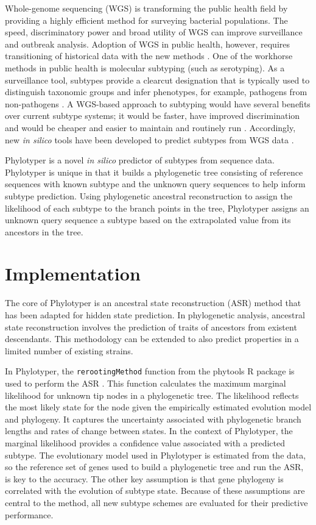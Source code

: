 \documentclass{bioinfo}
\begin{document}
Whole-genome sequencing (WGS) is transforming the public health field by providing a highly efficient method for surveying bacterial populations.
The speed, discriminatory power and broad utility of WGS can improve surveillance and outbreak analysis.
Adoption of WGS in public health, however, requires transitioning of historical data with the new methods \citep{Jenkins2015}.
One of the workhorse methods in public health is molecular subtyping (such as serotyping).
As a surveillance tool, subtypes provide a clearcut designation that is typically used to distinguish taxonomic groups and infer phenotypes, for example, pathogens from non-pathogens \citep{Jenkins2015}.
A WGS-based approach to subtyping would have several benefits over current subtype systems; it would be faster, have improved discrimination and would be cheaper and easier to maintain and routinely run \citep{Jenkins2015}.
Accordingly, new \textit{in silico} tools have been developed to predict subtypes from WGS data \citep{Inouye2014,Joensen2015,Ingle2016,Lindsey2016,CARRILLO2016}.

Phylotyper is a novel \textit{in silico} predictor of subtypes from sequence data. 
Phylotyper is unique in that it builds a phylogenetic tree consisting of reference sequences with known subtype and the unknown query sequences to help inform subtype prediction. 
Using phylogenetic ancestral reconstruction to assign the likelihood of each subtype to the branch points in the tree, Phylotyper assigns an unknown query sequence a subtype based on the extrapolated value from its ancestors in the tree.

\section{Implementation}

The core of Phylotyper is an ancestral state reconstruction (ASR) method that has been adapted for hidden state prediction.
In phylogenetic analysis, ancestral state reconstruction involves the prediction of traits of ancestors from existent descendants.
This methodology can be extended to also predict properties in a limited number of existing strains.

In Phylotyper, the \texttt{rerootingMethod} function from the phytools R package is used to perform the ASR \citep{Revell2011}.
This function calculates the maximum marginal likelihood for unknown tip nodes in a phylogenetic tree.
The likelihood reflects the most likely state for the node given the empirically estimated evolution model and phylogeny.
It captures the uncertainty associated with phylogenetic branch lengths and rates of change between states.
In the context of Phylotyper, the marginal likelihood provides a confidence value associated with a predicted subtype.
The evolutionary model used in Phylotyper is estimated from the data, so the reference set of genes used to build a phylogenetic tree and run the ASR, is key to the accuracy.
The other key assumption is that gene phylogeny is correlated with the evolution of subtype state.
Because of these assumptions are central to the method, all new subtype schemes are evaluated for their predictive performance.
\end{document}
